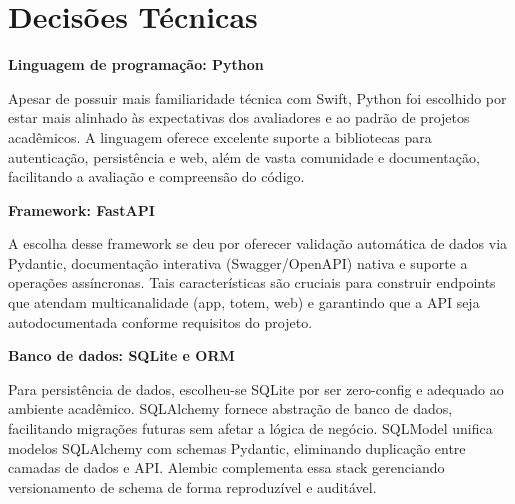 \section{Decisões Técnicas}

\hspace{0.5cm} \textbf{Linguagem de programação: Python}

Apesar de possuir mais familiaridade técnica com Swift, Python foi escolhido por estar mais alinhado às expectativas
dos avaliadores e ao padrão de projetos acadêmicos. A linguagem oferece excelente suporte a bibliotecas para autenticação,
persistência e web, além de vasta comunidade e documentação, facilitando a avaliação e compreensão do código.

\textbf{Framework: FastAPI}

A escolha desse framework se deu por oferecer validação automática de dados via Pydantic, documentação interativa
(Swagger/OpenAPI) nativa e suporte a operações assíncronas. Tais características são cruciais para construir
endpoints que atendam multicanalidade (app, totem, web) e garantindo que a API seja autodocumentada
conforme requisitos do projeto.

\textbf{Banco de dados: SQLite e ORM}

Para persistência de dados, escolheu-se SQLite por ser zero-config e adequado ao ambiente acadêmico.
SQLAlchemy fornece abstração de banco de dados, facilitando migrações futuras sem afetar a lógica de negócio.
SQLModel unifica modelos SQLAlchemy com schemas Pydantic, eliminando duplicação entre camadas de dados e API.
Alembic complementa essa stack gerenciando versionamento de schema de forma reproduzível e auditável.
